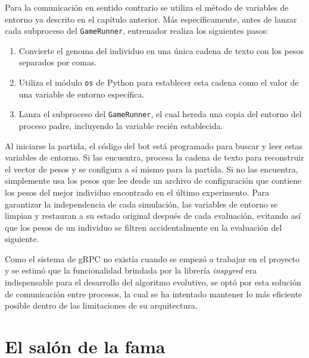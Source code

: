 Para la comunicación en sentido contrario se utiliza el método de variables de entorno ya descrito en el capítulo anterior. Más específicamente, antes de lanzar cada subproceso del \texttt{GameRunner}, entrenador realiza los siguientes pasos:
\begin{enumerate}
	\item Convierte el genoma del individuo en una única cadena de texto con los pesos separados por comas.
	\item Utiliza el módulo \texttt{os} de Python para establecer esta cadena como el valor de una variable de entorno específica.
	\item Lanza el subproceso del \texttt{GameRunner}, el cual hereda una copia del entorno del proceso padre, incluyendo la variable recién establecida.
\end{enumerate}

Al iniciarse la partida, el código del bot está programado para buscar y leer estas variables de entorno. Si las encuentra, procesa la cadena de texto para reconstruir el vector de pesos y se configura a sí mismo para la partida. Si no las encuentra, simplemente usa los pesos que lee desde un archivo de configuración que contiene los pesos del mejor individuo encontrado en el último experimento. Para garantizar la independencia de cada simulación, las variables de entorno se limpian y restauran a su estado original después de cada evaluación, evitando así que los pesos de un individuo se filtren accidentalmente en la evaluación del siguiente.

Como el sistema de gRPC no existía cuando se empezó a trabajar en el proyecto y se estimó que la funcionalidad brindada por la librería \textit{inspyred} era indispensable para el desarrollo del algoritmo evolutivo, se optó por esta solución de comunicación entre procesos, la cual se ha intentado mantener lo más eficiente posible dentro de las limitaciones de su arquitectura.


\section{El salón de la fama} \label{sec:salon_fama}

